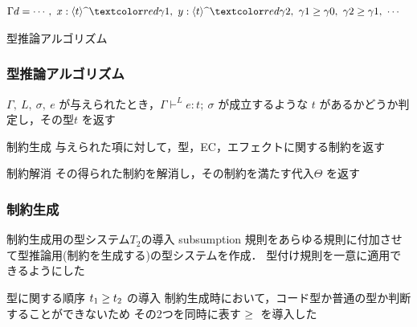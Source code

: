 \begin{frame}
  {\footnotesize
    \begin{align*}
      \Gamma d &= \cdots,~ x:\codeTs{t}{\red{\gamma1}},~ y:\codeTs{t}{\red{\gamma2}},~ \gamma1 \ord \gamma0,~ \gamma2 \ord \gamma1,~ \cdots
    \end{align*}
  }

\end{frame}

\begin{frame}
  \center
  \huge{型推論アルゴリズム}
\end{frame}

\begin{frame}
  \frametitle{型推論アルゴリズム}

  $\Gamma,~ L,~ \sigma,~ e$ が与えられたとき，$\Gamma \vdash^{L} e : t ;~\sigma$ が成立するような $t$ があるかどうか判定し，その型$t$ を返す

  \begin{exampleblock}{制約生成}
    与えられた項に対して，型，EC，エフェクトに関する制約を返す
  \end{exampleblock}
  \begin{exampleblock}{制約解消}
    その得られた制約を解消し，その制約を満たす代入$\Theta$ を返す
  \end{exampleblock}
\end{frame}



\begin{frame}
  \frametitle{制約生成}
  \begin{exampleblock}{制約生成用の型システム$T_2$の導入}
    subsumption 規則をあらゆる規則に付加させて型推論用(制約を生成する)の型システムを作成．
    型付け規則を一意に適用できるようにした
  \end{exampleblock}
  \begin{exampleblock}{型に関する順序 ${t_1} \ge {t_2}$ の導入}
    制約生成時において，コード型か普通の型か判断することができないため
    その2つを同時に表す${} \ge {}$ を導入した
  \end{exampleblock}
\end{frame}

